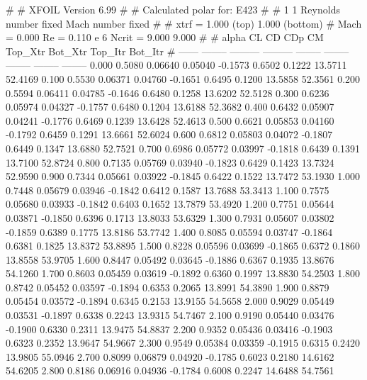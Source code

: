 #  
#       XFOIL         Version 6.99
#  
# Calculated polar for: E423                                            
#  
# 1 1 Reynolds number fixed          Mach number fixed         
#  
# xtrf =   1.000 (top)        1.000 (bottom)  
# Mach =   0.000     Re =     0.110 e 6     Ncrit =   9.000  9.000
#  
#   alpha    CL        CD       CDp       CM     Top_Xtr  Bot_Xtr  Top_Itr  Bot_Itr
#  ------ -------- --------- --------- -------- -------- -------- -------- --------
   0.000   0.5080   0.06640   0.05040  -0.1573   0.6502   0.1222  13.5711  52.4169
   0.100   0.5530   0.06371   0.04760  -0.1651   0.6495   0.1200  13.5858  52.3561
   0.200   0.5594   0.06411   0.04785  -0.1646   0.6480   0.1258  13.6202  52.5128
   0.300   0.6236   0.05974   0.04327  -0.1757   0.6480   0.1204  13.6188  52.3682
   0.400   0.6432   0.05907   0.04241  -0.1776   0.6469   0.1239  13.6428  52.4613
   0.500   0.6621   0.05853   0.04160  -0.1792   0.6459   0.1291  13.6661  52.6024
   0.600   0.6812   0.05803   0.04072  -0.1807   0.6449   0.1347  13.6880  52.7521
   0.700   0.6986   0.05772   0.03997  -0.1818   0.6439   0.1391  13.7100  52.8724
   0.800   0.7135   0.05769   0.03940  -0.1823   0.6429   0.1423  13.7324  52.9590
   0.900   0.7344   0.05661   0.03922  -0.1845   0.6422   0.1522  13.7472  53.1930
   1.000   0.7448   0.05679   0.03946  -0.1842   0.6412   0.1587  13.7688  53.3413
   1.100   0.7575   0.05680   0.03933  -0.1842   0.6403   0.1652  13.7879  53.4920
   1.200   0.7751   0.05644   0.03871  -0.1850   0.6396   0.1713  13.8033  53.6329
   1.300   0.7931   0.05607   0.03802  -0.1859   0.6389   0.1775  13.8186  53.7742
   1.400   0.8085   0.05594   0.03747  -0.1864   0.6381   0.1825  13.8372  53.8895
   1.500   0.8228   0.05596   0.03699  -0.1865   0.6372   0.1860  13.8558  53.9705
   1.600   0.8447   0.05492   0.03645  -0.1886   0.6367   0.1935  13.8676  54.1260
   1.700   0.8603   0.05459   0.03619  -0.1892   0.6360   0.1997  13.8830  54.2503
   1.800   0.8742   0.05452   0.03597  -0.1894   0.6353   0.2065  13.8991  54.3890
   1.900   0.8879   0.05454   0.03572  -0.1894   0.6345   0.2153  13.9155  54.5658
   2.000   0.9029   0.05449   0.03531  -0.1897   0.6338   0.2243  13.9315  54.7467
   2.100   0.9190   0.05440   0.03476  -0.1900   0.6330   0.2311  13.9475  54.8837
   2.200   0.9352   0.05436   0.03416  -0.1903   0.6323   0.2352  13.9647  54.9667
   2.300   0.9549   0.05384   0.03359  -0.1915   0.6315   0.2420  13.9805  55.0946
   2.700   0.8099   0.06879   0.04920  -0.1785   0.6023   0.2180  14.6162  54.6205
   2.800   0.8186   0.06916   0.04936  -0.1784   0.6008   0.2247  14.6488  54.7561
